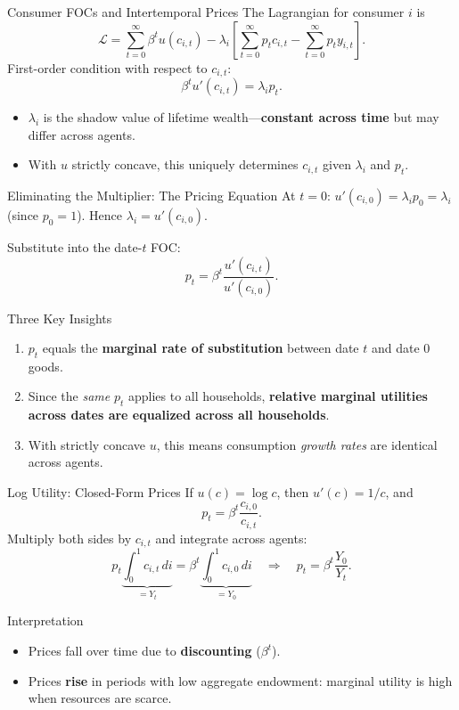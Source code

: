 \documentclass[aspectratio=169,10pt]{beamer}
\newcommand{\apxbutton}[1]{\hfill\hyperlink{#1}{\beamerbutton{Appendix}}}
\begin{document}
\begin{frame}{Consumer FOCs and Intertemporal Prices}
\hypertarget{m-foc-derivation}{}
The Lagrangian for consumer $i$ is
\[
\mathcal{L} = \sum_{t=0}^{\infty}\beta^t u(c_{i,t}) - \lambda_i\left[\sum_{t=0}^{\infty} p_t c_{i,t} - \sum_{t=0}^{\infty} p_t y_{i,t}\right].
\]
First-order condition with respect to $c_{i,t}$:
\[
\beta^t u'(c_{i,t})=\lambda_i p_t.
\]

\begin{itemize}
  \item $\lambda_i$ is the shadow value of lifetime wealth---\textbf{constant across time} but may differ across agents.
  \item With $u$ strictly concave, this uniquely determines $c_{i,t}$ given $\lambda_i$ and $p_t$.
\end{itemize}
\apxbutton{a1}
\end{frame}

\begin{frame}{Eliminating the Multiplier: The Pricing Equation}
At $t=0$: $u'(c_{i,0})=\lambda_i p_0 = \lambda_i$ (since $p_0=1$). Hence $\lambda_i = u'(c_{i,0})$.

\medskip
Substitute into the date-$t$ FOC:
\[
p_t
=
\beta^t
\frac{u'(c_{i,t})}{u'(c_{i,0})}.
\tag{5.3}
\]

\begin{block}{Three Key Insights}
\begin{enumerate}
  \item $p_t$ equals the \textbf{marginal rate of substitution} between date $t$ and date 0 goods.
  \item Since the \emph{same} $p_t$ applies to all households, \textbf{relative marginal utilities across dates are equalized across all households}.
  \item With strictly concave $u$, this means consumption \emph{growth rates} are identical across agents.
\end{enumerate}
\end{block}
\end{frame}

\begin{frame}{Log Utility: Closed-Form Prices}
\hypertarget{m-a2}{}
If $u(c)=\log c$, then $u'(c)=1/c$, and
\[
p_t=\beta^t \frac{c_{i,0}}{c_{i,t}}.
\]
Multiply both sides by $c_{i,t}$ and integrate across agents:
\[
p_t \underbrace{\int_0^1 c_{i,t}\,di}_{=Y_t}
=
\beta^t \underbrace{\int_0^1 c_{i,0}\,di}_{=Y_0}
\quad \Rightarrow \quad
\boxed{p_t=\beta^t \frac{Y_0}{Y_t}.}
\]

\begin{block}{Interpretation}
\begin{itemize}
  \item Prices fall over time due to \textbf{discounting} ($\beta^t$).
  \item Prices \textbf{rise} in periods with low aggregate endowment: marginal utility is high when resources are scarce.
\end{itemize}
\end{block}
\apxbutton{a2}
\end{frame}
\end{document}
